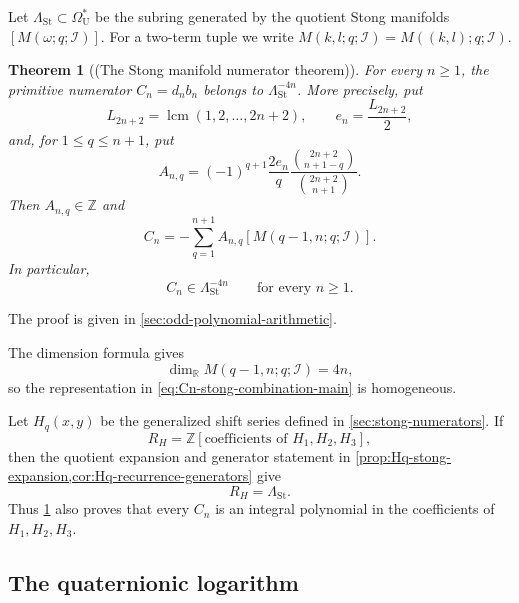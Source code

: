 \documentclass[14pt,dvipsnames]{extarticle}
\numberwithin{equation}{subsection}
\theoremstyle{plain}
\newtheorem{theorem}[theorem]{Theorem}
\theoremstyle{definition}
\theoremstyle{definition}
\DeclareMathOperator{\lcm}{lcm}
\newcommand{\OmU}{\Omega_{\mathrm U}^{\ast}}
\newcommand{\Ii}{\mathcal I}
\newcommand{\LambdaSt}{\Lambda_{\mathrm{St}}}
\begin{document}
Let $\LambdaSt\subset\OmU$ be the subring generated by the quotient Stong
manifolds $[M(\omega;q;\Ii)]$. For a two-term tuple we write
$M(k,l;q;\Ii)=M((k,l);q;\Ii)$.

\begin{theorem}[(The Stong manifold numerator theorem)]
\label{thm:stong-numerators}
For every $n\geq1$, the primitive numerator $C_n=d_nb_n$ belongs to
$\LambdaSt^{-4n}$. More precisely, put
\[
 L_{2n+2}=\lcm(1,2,\ldots,2n+2),
 \qquad
 e_n=\frac{L_{2n+2}}2,
\]
and, for $1\leq q\leq n+1$, put
\begin{equation}\label{eq:Anq-main}
 A_{n,q}
 =(-1)^{q+1}\frac{2e_n}{q}
   \frac{\binom{2n+2}{n+1-q}}{\binom{2n+2}{n+1}}.
\end{equation}
Then $A_{n,q}\in\mathbb Z$ and
\begin{equation}\label{eq:Cn-stong-combination-main}
 C_n
 =-\sum_{q=1}^{n+1}
 A_{n,q}[M(q-1,n;q;\Ii)].
\end{equation}
In particular,
\[
 C_n\in\LambdaSt^{-4n}
 \qquad\text{for every }n\geq1.
\]
\end{theorem}

The proof is given in \cref{sec:odd-polynomial-arithmetic}.

The dimension formula gives
\[
 \dim_{\mathbb R}M(q-1,n;q;\Ii)=4n,
\]
so the representation in \eqref{eq:Cn-stong-combination-main} is homogeneous.

Let $H_q(x,y)$ be the generalized shift series defined in
\cref{sec:stong-numerators}. If
\[
 R_H
 =\mathbb Z[\text{coefficients of }H_1,H_2,H_3],
\]
then the quotient expansion and generator statement in
\cref{prop:Hq-stong-expansion,cor:Hq-recurrence-generators} give
\begin{equation}\label{eq:RH-LambdaSt-main}
 R_H=\LambdaSt.
\end{equation}
Thus \cref{thm:stong-numerators} also proves that every $C_n$ is an integral
polynomial in the coefficients of $H_1,H_2,H_3$.

\subsection{The quaternionic logarithm}
\end{document}
